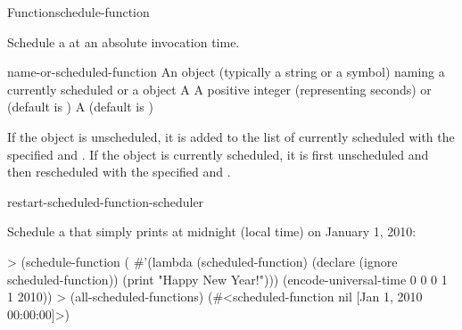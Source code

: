 \documentclass[10pt,twoside,english,pdftex]{article}
\begin{document}
\begin{functiondoc}{Function}{schedule-function}%
  { 
     }
%
%
%

\fnsyntax

\fnpurpose Schedule a  at an absolute invocation time.

\fnpackage {}

\fnmodule {}

\fnargs
\begin{args}{name-or-scheduled-function}
 An object (typically a string or a
  symbol) naming a currently scheduled  or a
   object
 A 
 A positive integer (representing seconds) or
  \nil{} (default is \nil)
\arg[verbose] A  
  (default is \textbf{})
\end{args}

\fnerrors
\nothreads{}

\fndescription If the  object is unscheduled, it is
added to the list of currently scheduled  with the
specified  and .  If the
 object is currently scheduled, it is first
unscheduled and then rescheduled with the specified 
and .

\begin{alsos}{restart-scheduled-function-scheduler}
\end{alsos}

%
\fnexamples
Schedule a  that simply prints  
at midnight (local time) on January 1, 2010:
\begin{example}
> (schedule-function
    (
      #'(lambda (scheduled-function)
          (declare (ignore scheduled-function))
          (print "Happy New Year!")))
     (encode-universal-time 0 0 0 1 1 2010))
> (all-scheduled-functions)
(#<scheduled-function nil [Jan 1, 2010 00:00:00]>)
\end{example}


\end{functiondoc}
\end{document}
